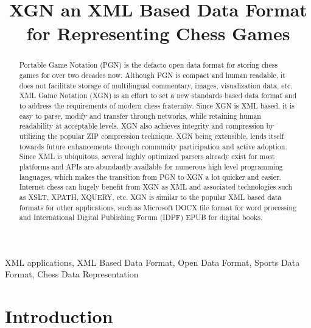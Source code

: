 \documentclass[conference]{IEEEtran}
\begin{document}
\title{XGN \textendash  an XML Based Data Format\\for Representing Chess Games}
\author{%
\and
{}
}
\maketitle
\begin{abstract}
Portable Game Notation (PGN) is the de\textendash facto open data format for storing chess games for over two decades now. Although PGN is compact and human readable, it does not facilitate storage of multilingual commentary, images, visualization data, etc. XML Game Notation (XGN) is an effort to set a new standards based data format and to address the requirements of modern chess fraternity. Since XGN is XML based, it is easy to parse, modify and transfer through networks, while retaining human readability at acceptable levels. XGN also achieves integrity and compression by utilizing the popular ZIP compression technique. XGN being extensible, lends itself towards future enhancements through community participation and active adoption. Since XML is ubiquitous, several highly optimized parsers already exist for most platforms and APIs are abundantly available for numerous high level programming languages, which makes the transition from PGN to XGN a lot quicker and easier. Internet chess can hugely benefit from XGN as XML and associated technologies such as XSLT, XPATH, XQUERY, etc. XGN is similar to the popular XML based data formats for other applications, such as Microsoft DOCX file format for word processing and International Digital Publishing Forum (IDPF) EPUB for digital books.
\end{abstract}
\begin{IEEEkeywords}
XML applications, XML Based Data Format, Open Data Format, Sports Data Format, Chess Data Representation
\end{IEEEkeywords}
\section{Introduction}
\end{document}

